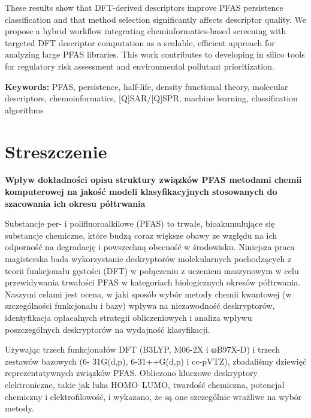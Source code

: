 These results show that DFT-derived descriptors improve PFAS persistence classification and that method selection significantly affects descriptor quality. We propose a hybrid workflow integrating cheminformatics-based screening with targeted DFT descriptor computation as a scalable, efficient approach for analyzing large PFAS libraries. This work contributes to developing in silico tools for regulatory risk assessment and environmental pollutant prioritization.

\vspace{0.1cm}
\textbf{Keywords:} PFAS, persistence, half-life, density functional theory, molecular descriptors, chemoinformatics, [Q]SAR/[Q]SPR, machine learning, classification algorithms

\clearpage
\chapter*{\vspace*{-2em} Streszczenie}
\vspace{-1.2cm}

\textbf{Wpływ dokładności opisu struktury związków PFAS metodami chemii komputerowej na jakość modeli klasyfikacyjnych stosowanych do szacowania ich okresu półtrwania}

\vspace{0.2cm}

Substancje per- i polifluoroalkilowe (PFAS) to trwałe, bioakumulujące się substancje chemiczne,
które budzą coraz większe obawy ze względu na ich odporność na degradację i powszechną obecność w
środowisku. Niniejsza praca magisterska bada wykorzystanie deskryptorów molekularnych pochodzących z teorii funkcjonału gęstości (DFT) w połączeniu z uczeniem maszynowym w celu przewidywania trwałości PFAS w kategoriach biologicznych okresów półtrwania. Naszymi celami jest ocena, w jaki sposób wybór metody chemii kwantowej
(w szczególności funkcjonału i bazy) wpływa na niezawodność deskryptorów, identyfikacja opłacalnych strategii obliczeniowych i analiza wpływu poszczególnych deskryptorów na
wydajność klasyfikacji.

Używając trzech funkcjonałów DFT (B3LYP, M06-2X i ωB97X-D) i trzech zestawów bazowych (6-
31G(d,p), 6-31++G(d,p) i cc-pVTZ), zbadaliśmy dziewięć reprezentatywnych związków PFAS.
Obliczono kluczowe deskryptory elektroniczne, takie jak luka HOMO–LUMO, twardość chemiczna, potencjał chemiczny i elektrofilowość, i wykazano, że są one szczególnie wrażliwe na wybór metody.

